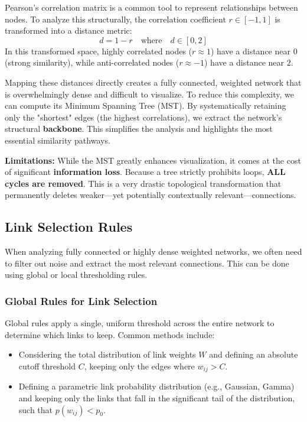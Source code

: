 \begin{example}
    Pearson’s correlation matrix is a common tool to represent relationships between nodes. To analyze this structurally, the correlation coefficient $r \in [-1, 1]$ is transformed into a distance metric:
    $$d = 1 - r \quad \text{where} \quad d \in [0, 2]$$
    In this transformed space, highly correlated nodes ($r \approx 1$) have a distance near $0$ (strong similarity), while anti-correlated nodes ($r \approx -1$) have a distance near $2$.

    Mapping these distances directly creates a fully connected, weighted network that is overwhelmingly dense and difficult to visualize. To reduce this complexity, we can compute its Minimum Spanning Tree (MST). By systematically retaining only the "shortest" edges (the highest correlations), we extract the network's structural \textbf{backbone}. This simplifies the analysis and highlights the most essential similarity pathways.

    \textbf{Limitations:}
    While the MST greatly enhances visualization, it comes at the cost of significant \textbf{information loss}. Because a tree strictly prohibits loops, \textbf{ALL cycles are removed}. This is a very drastic topological transformation that permanently deletes weaker—yet potentially contextually relevant—connections.
\end{example}

\subsection{Link Selection Rules}

When analyzing fully connected or highly dense weighted networks, we often need to filter out noise and extract the most relevant connections. This can be done using global or local thresholding rules.

\subsubsection{Global Rules for Link Selection}
Global rules apply a single, uniform threshold across the entire network to determine which links to keep. Common methods include:
\begin{itemize}
    \item Considering the total distribution of link weights $W$ and defining an absolute cutoff threshold $C$, keeping only the edges where $w_{ij} > C$.
    \item Defining a parametric link probability distribution (e.g., Gaussian, Gamma) and keeping only the links that fall in the significant tail of the distribution, such that $p(w_{ij}) < p_0$.
\end{itemize}


